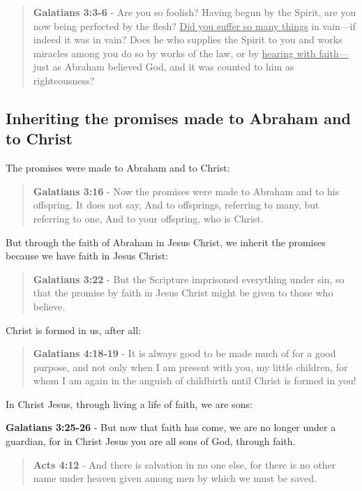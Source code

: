 \documentclass[11pt]{article}
\begin{document}
\begin{quote}
\textbf{Galatians 3:3-6} - Are you so foolish? Having begun by the Spirit, are you now being perfected by the flesh? \uline{Did you suffer so many things} in vain—if indeed it was in vain? Does he who supplies the Spirit to you and works miracles among you do so by works of the law, or by \uline{hearing with faith—} just as Abraham believed God, and it was counted to him as righteousness?
\end{quote}

\subsection{Inheriting the promises made to Abraham and to Christ}
\label{sec:orgc70b2b1}

The promises were made to Abraham and to Christ:

\begin{quote}
\textbf{Galatians 3:16} - Now the promises were made to Abraham and to his offspring. It does not say, And to offsprings, referring to many, but referring to one, And to your offspring, who is Christ.
\end{quote}

But through the faith of Abraham in Jesus Christ, we inherit the promises because we have faith in Jesus Christ:

\begin{quote}
\textbf{Galatians 3:22} - But the Scripture imprisoned everything under sin, so that the promise by faith in Jesus Christ might be given to those who believe.
\end{quote}

Christ is formed in us, after all:

\begin{quote}
\textbf{Galatians 4:18-19} - It is always good to be made much of for a good purpose, and not only when I am present with you, my little children, for whom I am again in the anguish of childbirth until Christ is formed in you!
\end{quote}

In Christ Jesus, through living a life of faith, we are sons:

\textbf{Galatians 3:25-26} - But now that faith has come, we are no longer under a guardian, for in Christ Jesus you are all sons of God, through faith.

\begin{quote}
\textbf{Acts 4:12} - And there is salvation in no one else, for there is no other name under heaven given among men by which we must be saved.
\end{quote}
\end{document}
